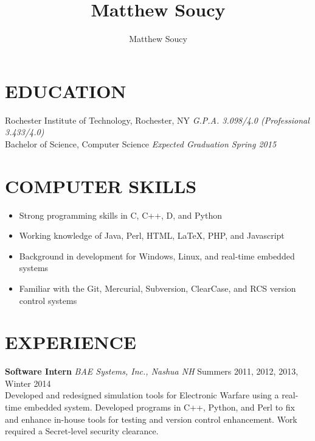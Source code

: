 \documentclass[line]{res}
\author{Matthew Soucy}
\title{Matthew Soucy}
\begin{document}
\setlength{\textheight}{11.5in} %
\address{\large
		2433 Nathaniel Rochester Hall
		\\
		Rochester, NY 14623
		\\
		(585) 204-7402
}

\begin{resume}

\section{EDUCATION}

	Rochester Institute of Technology, Rochester, NY
	\hfill
	\textit{G.P.A. 3.098/4.0 (Professional 3.433/4.0)}
	\\
	Bachelor of Science, Computer Science
	\hfill
	\textit{Expected Graduation Spring 2015}

\section{COMPUTER SKILLS}

	\begin{itemize}[leftmargin=10pt]
	\item Strong programming skills in C, C++, D, and Python
	\item Working knowledge of Java, Perl, HTML, LaTeX, PHP, and Javascript
	\item Background in development for Windows, Linux, and real-time embedded systems
	\item Familiar with the Git, Mercurial, Subversion, ClearCase, and RCS version control systems
	\end{itemize}

\section{EXPERIENCE}

	\textbf{Software Intern}
	\textit{BAE Systems, Inc., Nashua NH}
	\hfill
	Summers 2011, 2012, 2013, Winter 2014\\
	Developed and redesigned simulation tools for Electronic Warfare using a real-time embedded system.
	Developed programs in C++, Python, and Perl to fix and enhance in-house tools for testing and version control enhancement.
	Work required a Secret-level security clearance.


\end{resume}
\end{document}
